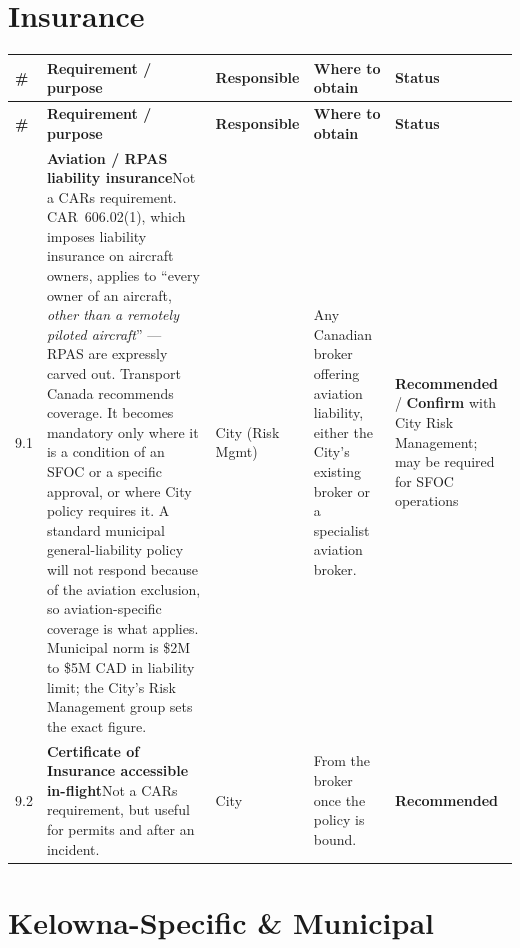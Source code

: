 \documentclass[11pt,letterpaper]{article}
\newcommand{\itemrule}{\arrayrulecolor{uavrule}\midrule\arrayrulecolor{black}}
\newcommand{\reqcell}[2]{\textbf{#1}\newline\small\color{uavgrey}#2}
\newcommand{\confirm}{\textbf{\color{uavgood!80!black}Confirm}}
\newcommand{\rec}{\textbf{\color{uavgrey!75!black}Recommended}}
\newcommand{\checklisthead}{%
  \toprule
  \color{uavblue}\bfseries\# &
  \color{uavblue}\bfseries Requirement / purpose &
  \color{uavblue}\bfseries Responsible &
  \color{uavblue}\bfseries Where to obtain &
  \color{uavblue}\bfseries Status \\
  \midrule
}
\begin{document}
\newpage

\section{Insurance}

\begin{longtable}{@{}L{0.28in} L{2.20in} L{0.85in} L{1.95in} L{0.85in}@{}}
\checklisthead
\endfirsthead \checklisthead \endhead

9.1 &
\reqcell{Aviation / RPAS liability insurance}{Not a CARs requirement. CAR~606.02(1), which imposes liability insurance on aircraft owners, applies to ``every owner of an aircraft, \emph{other than a remotely piloted aircraft}'' --- RPAS are expressly carved out. Transport Canada recommends coverage. It becomes mandatory only where it is a condition of an SFOC or a specific approval, or where City policy requires it. A standard municipal general-liability policy will not respond because of the aviation exclusion, so aviation-specific coverage is what applies. Municipal norm is \$2M to \$5M CAD in liability limit; the City's Risk Management group sets the exact figure.} &
City (Risk Mgmt) &
Any Canadian broker offering aviation liability, either the City's existing broker or a specialist aviation broker. &
\rec{} / \confirm{} with City Risk Management; may be required for SFOC operations \\ \itemrule

9.2 &
\reqcell{Certificate of Insurance accessible in-flight}{Not a CARs requirement, but useful for permits and after an incident.} &
City &
From the broker once the policy is bound. &
\rec{} \\

\end{longtable}

\newpage

\section{Kelowna-Specific \& Municipal}
\end{document}
